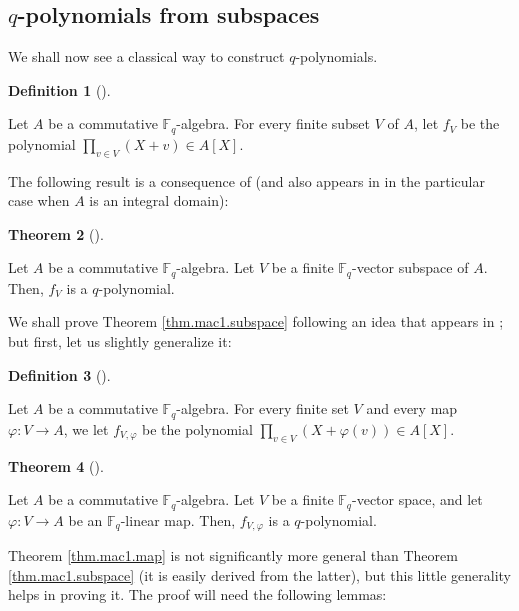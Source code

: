 \documentclass[numbers=enddot,12pt,final,onecolumn,notitlepage]{scrartcl}%
\theoremstyle{definition}
\newtheorem{theo}{Theorem}[section]
\newenvironment{theorem}[1][]
{\begin{theo}[#1]\begin{leftbar}}
{\end{leftbar}\end{theo}}
\newtheorem{defi}[theo]{Definition}
\newenvironment{definition}[1][]
{\begin{defi}[#1]\begin{leftbar}}
{\end{leftbar}\end{defi}}
\let\prodnonlimits\prod
\renewcommand{\prod}{\prodnonlimits\limits}
\begin{document}
\subsection{$q$-polynomials from subspaces}

We shall now see a classical way to construct $q$-polynomials.

\begin{definition}
Let $A$ be a commutative $\mathbb{F}_{q}$-algebra. For every finite subset $V$
of $A$, let $f_{V}$ be the polynomial $\prod_{v\in V}\left(  X+v\right)  \in
A\left[  X\right]  $.
\end{definition}

The following result is a consequence of \cite[(7.7)]{mac-schurvar} (and also
appears in \cite[Theorem A.1 2)]{kc-carlitz} in the particular case when $A$
is an integral domain):

\begin{theorem}
\label{thm.mac1.subspace}Let $A$ be a commutative $\mathbb{F}_{q}$-algebra.
Let $V$ be a finite $\mathbb{F}_{q}$-vector subspace of $A$. Then, $f_{V}$ is
a $q$-polynomial.
\end{theorem}

We shall prove Theorem \ref{thm.mac1.subspace} following an idea that appears
in \cite[proof of (7.15)]{mac-schurvar}; but first, let us slightly generalize it:

\begin{definition}
Let $A$ be a commutative $\mathbb{F}_{q}$-algebra. For every finite set $V$
and every map $\varphi:V\rightarrow A$, we let $f_{V,\varphi}$ be the
polynomial $\prod_{v\in V}\left(  X+\varphi\left(  v\right)  \right)  \in
A\left[  X\right]  $.
\end{definition}

\begin{theorem}
\label{thm.mac1.map}Let $A$ be a commutative $\mathbb{F}_{q}$-algebra. Let $V$
be a finite $\mathbb{F}_{q}$-vector space, and let $\varphi:V\rightarrow A$ be
an $\mathbb{F}_{q}$-linear map. Then, $f_{V,\varphi}$ is a $q$-polynomial.
\end{theorem}

Theorem \ref{thm.mac1.map} is not significantly more general than Theorem
\ref{thm.mac1.subspace} (it is easily derived from the latter), but this
little generality helps in proving it. The proof will need the following lemmas:
\end{document}
